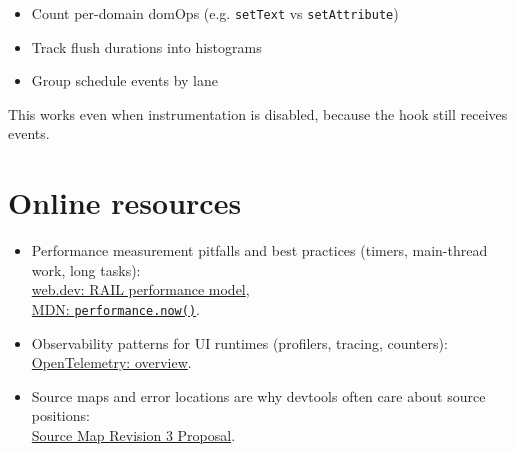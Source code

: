 \begin{itemize}
\item Count per-domain domOps (e.g. \texttt{setText} vs \texttt{setAttribute})
\item Track flush durations into histograms
\item Group schedule events by lane
\end{itemize}

This works even when instrumentation is disabled, because the hook still receives events.

\section{Online resources}

\begin{itemize}
\item Performance measurement pitfalls and best practices (timers, main-thread work, long tasks):\\
\href{https://web.dev/articles/rail}{web.dev: RAIL performance model},\\
\href{https://developer.mozilla.org/en-US/docs/Web/API/Performance/now}{MDN: \texttt{performance.now()}}.

\item Observability patterns for UI runtimes (profilers, tracing, counters):\\
\href{https://opentelemetry.io/docs/what-is-opentelemetry/}{OpenTelemetry: overview}.

\item Source maps and error locations are why devtools often care about source positions:\\
\href{https://sourcemaps.info/spec.html}{Source Map Revision 3 Proposal}.
\end{itemize}
